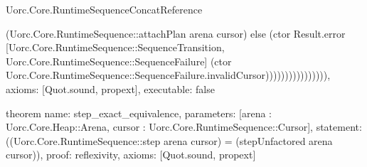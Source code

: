 \begin{lexlean}{Uorc.Core.RuntimeSequenceConcatReference}
\begin{semanticmodule}
{(Uorc.Core.RuntimeSequence::attachPlan arena cursor) else (ctor Result.error [Uorc.Core.RuntimeSequence::SequenceTransition, Uorc.Core.RuntimeSequence::SequenceFailure] (ctor Uorc.Core.RuntimeSequence::SequenceFailure.invalidCursor)))))))))))))))),
  axioms: [Quot.sound, propext],
  executable: false
}

theorem{
  name: step_exact_equivalence,
  parameters: [arena : Uorc.Core.Heap::Arena, cursor : Uorc.Core.RuntimeSequence::Cursor],
  statement: ((Uorc.Core.RuntimeSequence::step arena cursor) = (stepUnfactored arena cursor)),
  proof: reflexivity{},
  axioms: [Quot.sound, propext]
}
\end{semanticmodule}
\end{lexlean}
